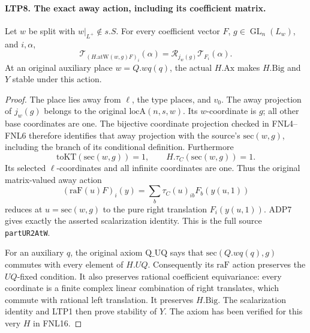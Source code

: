 \documentclass[11pt,a4paper]{article}
\numberwithin{equation}{section}
\theoremstyle{remark}\newtheorem{remark}[theorem]{Remark}
\begin{document}
\paragraph{LTP8. The exact away action, including its coefficient matrix.}
\label{claim:LTP8}
Let \(w\) be split with \(w|_{L^+}\notin s.S\).  For every
coefficient vector \(F\), \(g\in\operatorname{GL}_n(L_w)\),
and \(i,\alpha\),
\[
 \mathcal T_{(H.\mathrm{atW}(w,g)F)_i}(\alpha)
                    =\mathscr R_{j_w(g)}\mathcal T_{F_i}(\alpha).
\]
At an original auxiliary place \(w=Q.wq(q)\), the actual
\(H.\mathrm{Ax}\) makes \(H.\mathrm{Big}\) and \(Y\) stable
under this action.
\begin{proof}
The place lies away from \(\ell\), the type places, and \(v_0\).
The away projection of \(j_w(g)\) belongs to the original
\(\mathrm{locA}(n,s,w)\).  Its \(w\)-coordinate is \(g\);
all other base coordinates are one.  The bijective coordinate
projection checked in FNL4--FNL6 therefore identifies that away
projection with the source's \(\mathrm{sec}(w,g)\), including
the branch of its conditional definition.  Furthermore
\[
 \mathrm{toKT}(\mathrm{sec}(w,g))=1,\qquad
 H.\tau_C(\mathrm{sec}(w,g))=1.
\]
Its selected \(\ell\)-coordinates and all infinite coordinates
are one.  Thus the original matrix-valued away action
\[
  (\mathrm{raF}(u)F)_i(y)
       =\sum_b\tau_C(u)_{ib}F_b(y(u,1))
\]
reduces at \(u=\mathrm{sec}(w,g)\) to the pure right translation
\(F_i(y(u,1))\).  ADP7 gives exactly the asserted scalarization
identity.  This is the full source \texttt{part\allowbreak UR2At\allowbreak W}.

For an auxiliary \(q\), the original axiom \(\mathrm{Q\_\allowbreak UQ}\)
says that \(\mathrm{sec}(Q.wq(q),g)\) commutes with every element
of \(H.UQ\).  Consequently its \(\mathrm{raF}\) action preserves
the \(UQ\)-fixed condition.  It also preserves rational coefficient
equivariance: every coordinate is a finite complex linear
combination of right translates, which commute with rational
left translation.  It preserves \(H.\mathrm{Big}\).
The scalarization identity and LTP1 then prove stability of \(Y\).
The axiom has been verified for this very \(H\) in FNL16.
\end{proof}

\end{document}
